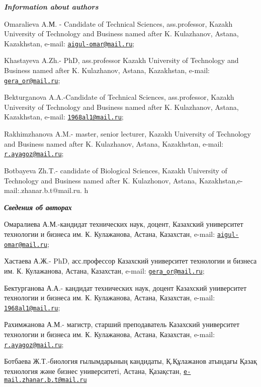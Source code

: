 \begin{authorinfo}
\emph{{\bfseries Information about authors}}

Omaralieva A.М. - Candidate of Technical Sciences, ass.professor, Kazakh
University of Technology and Business named after K. Kulazhanov, Astana,
Kazakhstan, e-mail:
\href{mailto:aigul-omar@mail.ru}{\nolinkurl{aigul-omar@mail.ru}};

Khastayeva A.Zh.- PhD, ass.professor Kazakh University of Technology and
Business named after K. Kulazhanov, Astana, Kazakhstan, e-mail:
\href{mailto:gera_or@mail.ru}{\nolinkurl{gera\_or@mail.ru}};

Bekturganova A.A.-Candidate of Technical Sciences, ass.professor, Kazakh
University of Technology and Business named after K. Kulazhanov, Astana,
Kazakhstan, e-mail:
\href{mailto:1968al1@mail.ru}{\nolinkurl{1968al1@mail.ru}};

Rakhimzhanova A.M.- master, senior lecturer, Kazakh University of
Technology and Business named after K. Kulazhanov, Astana, Kazakhstan,
e-mail: \href{mailto:r.ayagoz@mail.ru}{\nolinkurl{r.ayagoz@mail.ru}};

Botbayeva Zh.T.- candidate of Biological Sciences, Kazakh University of
Technology and Business named after K. Kulazhonov, Astana,
Kazakhstan,e-mail:.zhanar.b.t@mail.ru. h

\emph{{\bfseries Сведения об авторах}}

Омаралиева А.М.-кандидат технических наук, доцент, Казахский университет
технологии и бизнеса им. К. Кулажанова, Астана, Казахстан, e-mail:
\href{mailto:aigul-omar@mail.ru}{\nolinkurl{aigul-omar@mail.ru}};

Хастаева А.Ж.- PhD, асс.профессор Казахский университет технологии и
бизнеса им. К. Кулажанова, Астана, Казахстан, e-mail:
\href{mailto:gera_or@mail.ru}{\nolinkurl{gera\_or@mail.ru}};

Бектурганова А.А.- кандидат технических наук, доцент Казахский
университет технологии и бизнеса им. К. Кулажанова, Астана, Казахстан,
e-mail: \href{mailto:1968al1@mail.ru}{\nolinkurl{1968al1@mail.ru}};

Рахимжанова А.М.- магистр, старший преподаватель Казахский университет
технологии и бизнеса им. К. Кулажанова, Астана, Казахстан, e-mail:
\href{mailto:r.ayagoz@mail.ru}{\nolinkurl{r.ayagoz@mail.ru}};

Ботбаева Ж.Т.-биология ғылымдарының кандидаты, Қ.Құлажанов атындағы
Қазақ технология және бизнес университеті, Астана, Қазақстан,
\href{mailto:e-mail.zhanar.b.t@mail.ru}{\nolinkurl{e-mail.zhanar.b.t@mail.ru}}
\end{authorinfo}
